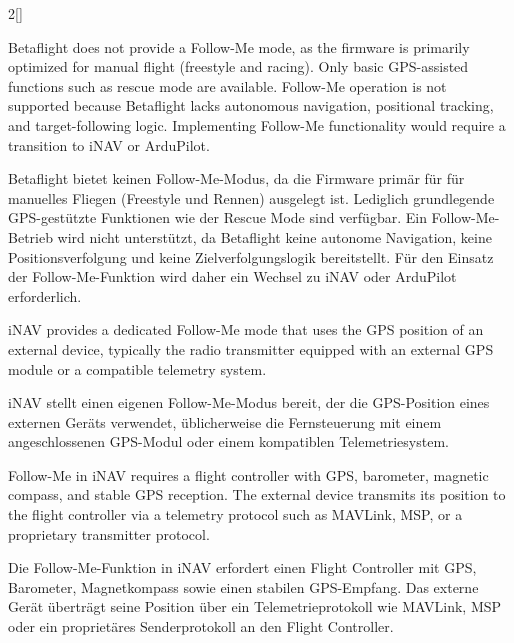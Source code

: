 \begin{paracol}{2}[]
\colende

\renewcommand{\deutschertitel}{Follow-Me mit Betaflight}
\renewcommand{\englischertitel}{Follow-Me with Betaflight}
\makroabschnitt
\label{AbschnittFollowMeBetaflight}

Betaflight does not provide a Follow-Me mode, as the firmware is primarily optimized for manual flight (freestyle and racing). Only basic GPS-assisted functions such as rescue mode are available. Follow-Me operation is not supported because Betaflight lacks autonomous navigation, positional tracking, and target-following logic. Implementing Follow-Me functionality would require a transition to iNAV or ArduPilot.

\colger

Betaflight bietet keinen Follow-Me-Modus, da die Firmware primär für für manuelles Fliegen (Freestyle und Rennen) ausgelegt ist. Lediglich grundlegende GPS-gestützte Funktionen wie der Rescue Mode sind verfügbar. Ein Follow-Me-Betrieb wird nicht unterstützt, da Betaflight keine autonome Navigation, keine Positionsverfolgung und keine Zielverfolgungslogik bereitstellt. Für den Einsatz der Follow-Me-Funktion wird daher ein Wechsel zu iNAV oder ArduPilot erforderlich.

\colende

\renewcommand{\deutschertitel}{Follow-Me mit iNAV}
\renewcommand{\englischertitel}{Follow-Me with iNAV}
\makroabschnitt
\label{AbschnittFollowMeINAV}

iNAV provides a dedicated Follow-Me mode that uses the GPS position of an external device, typically the radio transmitter equipped with an external GPS module or a compatible telemetry system. 

\colger

iNAV stellt einen eigenen Follow-Me-Modus bereit, der die GPS-Position eines externen Geräts verwendet, üblicherweise die Fernsteuerung mit einem angeschlossenen GPS-Modul oder einem kompatiblen Telemetriesystem. 

\coleng

Follow-Me in iNAV requires a flight controller with GPS, barometer, magnetic compass, and stable GPS reception. The external device transmits its position to the flight controller via a telemetry protocol such as MAVLink, MSP, or a proprietary transmitter protocol.

\colger

Die Follow-Me-Funktion in iNAV erfordert einen Flight Controller mit GPS, Barometer, Magnetkompass sowie einen stabilen GPS-Empfang. Das externe Gerät überträgt seine Position über ein Telemetrieprotokoll wie MAVLink, MSP oder ein proprietäres Senderprotokoll an den Flight Controller.


\end{paracol}

